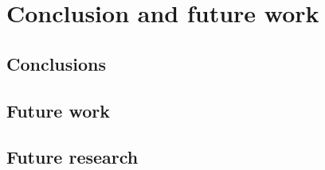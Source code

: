 
\chapter{Conclusion and future work} %

\label{Chapter8} %


\section{Conclusions}


\section{Future work}


\section{Future research}

